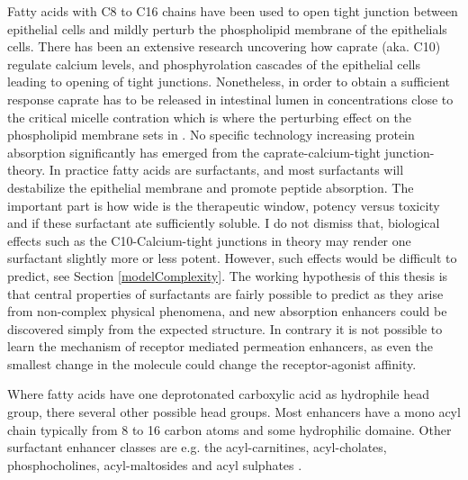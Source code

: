Fatty acids with C8 to C16 chains have been used to open tight junction between epithelial cells and mildly perturb the phospholipid membrane of the epithelials cells. There has been an extensive research \cite{bruno2013basics,maher2009safety,artursson1990epithelial} uncovering how caprate (aka. C10) regulate calcium levels, and phosphyrolation cascades of the epithelial cells leading to opening of tight junctions. Nonetheless, in order to obtain a sufficient response caprate has to be released in intestinal lumen in concentrations close to the critical micelle contration which is where the perturbing effect on the phospholipid membrane sets in \cite{bruno2013basics}. No specific technology increasing protein absorption significantly has emerged from the caprate-calcium-tight junction-theory. In practice fatty acids are surfactants, and most surfactants will destabilize the epithelial membrane and promote peptide absorption. The important part is how wide is the therapeutic window, potency versus toxicity and if these surfactant ate sufficiently soluble. I do not dismiss that, biological effects such as the C10-Calcium-tight junctions in theory may render one surfactant slightly more or less potent. However, such effects would be difficult to predict, see Section \ref{modelComplexity}. The working hypothesis of this thesis is that central properties of surfactants are fairly possible to predict as they arise from non-complex physical phenomena, and new absorption enhancers could be discovered simply from the expected structure. In contrary it is not possible to learn the mechanism of receptor mediated permeation enhancers, as even the smallest change in the molecule could change the receptor-agonist affinity.

Where fatty acids have one deprotonated carboxylic acid as hydrophile head group, there several other possible head groups. Most enhancers have a mono acyl chain typically from 8 to 16 carbon atoms and some hydrophilic domaine. Other surfactant enhancer classes are e.g. the acyl-carnitines, acyl-cholates\cite{lee2000oral}, phosphocholines\cite{liu1999dodecylphosphocholine}, acyl-maltosides \cite{petersen2013colonic} and acyl sulphates \cite{anderberg1993epithelial}.

